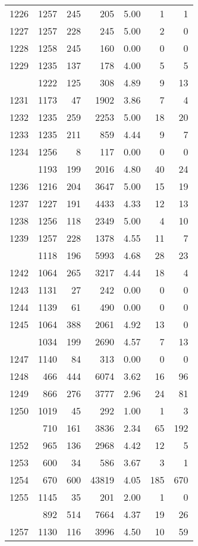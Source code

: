 \documentclass[
]{article}
\begin{document}
\begin{table}
\begin{tabular}[t]{lrrrrrr}
1226 & 1257 & 245 & 205 & 5.00 & 1 & 1\\
1227 & 1257 & 228 & 245 & 5.00 & 2 & 0\\
1228 & 1258 & 245 & 160 & 0.00 & 0 & 0\\
1229 & 1235 & 137 & 178 & 4.00 & 5 & 5\\
\addlinespace
1230 & 1222 & 125 & 308 & 4.89 & 9 & 13\\
1231 & 1173 & 47 & 1902 & 3.86 & 7 & 4\\
1232 & 1235 & 259 & 2253 & 5.00 & 18 & 20\\
1233 & 1235 & 211 & 859 & 4.44 & 9 & 7\\
1234 & 1256 & 8 & 117 & 0.00 & 0 & 0\\
\addlinespace
1235 & 1193 & 199 & 2016 & 4.80 & 40 & 24\\
1236 & 1216 & 204 & 3647 & 5.00 & 15 & 19\\
1237 & 1227 & 191 & 4433 & 4.33 & 12 & 13\\
1238 & 1256 & 118 & 2349 & 5.00 & 4 & 10\\
1239 & 1257 & 228 & 1378 & 4.55 & 11 & 7\\
\addlinespace
1241 & 1118 & 196 & 5993 & 4.68 & 28 & 23\\
1242 & 1064 & 265 & 3217 & 4.44 & 18 & 4\\
1243 & 1131 & 27 & 242 & 0.00 & 0 & 0\\
1244 & 1139 & 61 & 490 & 0.00 & 0 & 0\\
1245 & 1064 & 388 & 2061 & 4.92 & 13 & 0\\
\addlinespace
1246 & 1034 & 199 & 2690 & 4.57 & 7 & 13\\
1247 & 1140 & 84 & 313 & 0.00 & 0 & 0\\
1248 & 466 & 444 & 6074 & 3.62 & 16 & 96\\
1249 & 866 & 276 & 3777 & 2.96 & 24 & 81\\
1250 & 1019 & 45 & 292 & 1.00 & 1 & 3\\
\addlinespace
1251 & 710 & 161 & 3836 & 2.34 & 65 & 192\\
1252 & 965 & 136 & 2968 & 4.42 & 12 & 5\\
1253 & 600 & 34 & 586 & 3.67 & 3 & 1\\
1254 & 670 & 600 & 43819 & 4.05 & 185 & 670\\
1255 & 1145 & 35 & 201 & 2.00 & 1 & 0\\
\addlinespace
1256 & 892 & 514 & 7664 & 4.37 & 19 & 26\\
1257 & 1130 & 116 & 3996 & 4.50 & 10 & 59\\

\end{tabular}
\end{table}
\end{document}
